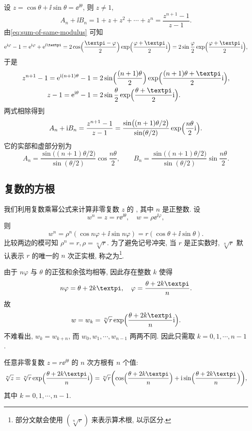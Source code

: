 \begin{solution}
  设 $z=\cos\theta+\ii\sin\theta=\ee^{\ii\theta}$, 则 $z\neq 1$,
  \[
    A_n+\ii B_n=1+z+z^2+\cdots+z^n=\frac{z^{n+1}-1}{z-1}.
  \]
  由\eqref{eq:sum-of-same-modulus} 可知
  \[
     \ee^{\ii\varphi}-1
    =\ee^{\ii\varphi}+\ee^{\ii\cpi}
    =2\cos\Bigl(\frac{\cpi-\varphi}2\Bigr)\exp\Bigl(\frac{\varphi+\cpi}2\ii\Bigr)
    =2\sin\frac\varphi2\exp\Bigl(\frac{\varphi+\cpi}2\ii\Bigr),
  \]
  于是
  \begin{align*}
     z^{n+1}-1
    =\ee^{\ii(n+1)\theta}-1&
    =2\sin\Bigl(\frac{(n+1)\theta}2\Bigr)\exp\Bigl(\frac{(n+1)\theta+\cpi}2\ii\Bigr),\\
     z-1
    =\ee^{\ii\theta}-1&
    =2\sin{\frac\theta2}\exp\Bigl(\frac{\theta+\cpi}2\ii\Bigr).
  \end{align*}
  两式相除得到
  \[
     A_n+\mathrm{i} B_n
    =\frac{z^{n+1}-1}{z-1}
    =\frac{\sin\bigl((n+1)\theta/2\bigr)}{\sin(\theta/2)}\exp\Bigl(\frac{n\theta}2\mathrm{i}\Bigr).
  \]
  它的实部和虚部分别为
  \[
     A_n
    =\frac{\sin\bigl((n+1)\theta/2\bigr)}{\sin(\theta/2)}\cos\frac{n\theta}2,\qquad
    B_n
     =\frac{\sin\bigl((n+1)\theta/2\bigr)}{\sin(\theta/2)}\sin\frac{n\theta}2.
  \]
\end{solution}


\subsection{复数的方根}

我们利用复数乘幂公式来计算非零复数 $z$ 的 , 其中 $n$ 是正整数.
设
\[
  w^n=z=r\ee^{\ii\theta},\quad 
  w=\rho \ee^{\ii\varphi},
\]
则
\[
  w^n=\rho^n(\cos{n\varphi}+\ii\sin{n\varphi})
     =r(\cos\theta+\ii\sin\theta).
\]
比较两边的模可知 $\rho^n=r,\rho=\sqrt[n]r$.
为了避免记号冲突, 当 $r$ 是正实数时, $\sqrt[n]r$ 默认表示 $r$ 的唯一的 $n$ 次正实根, 称之为\footnote{%
  部分文献会使用 $(\sqrt[n]r)$ 来表示算术根, 以示区分.%
}.

由于 $n\varphi$ 与 $\theta$ 的正弦和余弦均相等, 因此存在整数 $k$ 使得
\[
  n\varphi=\theta+2k\cpi,\quad \varphi=\frac{\theta+2k\cpi}n.
\]
故
\[
  w=w_k=\sqrt[n]r\exp\Bigl(\frac{\theta+2k\cpi}n\ii\Bigr).
\]
不难看出, $w_k=w_{k+n}$, 而 $w_0,w_1,\cdots,w_{n-1}$ 两两不同.
因此只需取 $k=0,1,\cdots,n-1$.
\begin{theorem}
  \label{thm:root}
  任意非零复数 $z=r\ee^{\ii\theta}$ 的 $n$ 次方根有 $n$ 个值:
  \[
     \sqrt[n]z
    =\sqrt[n]r\exp\Bigl(\frac{\theta+2k\cpi}n\ii\Bigr)
    =\sqrt[n]r\biggl(
      \cos\Bigl(\frac{\theta+2k\cpi}n\Bigr)
      +\ii\sin\Bigl(\frac{\theta+2k\cpi}n\Bigr)
    \biggr),
  \]
  其中 $k=0,1,\cdots,n-1$.
\end{theorem}

